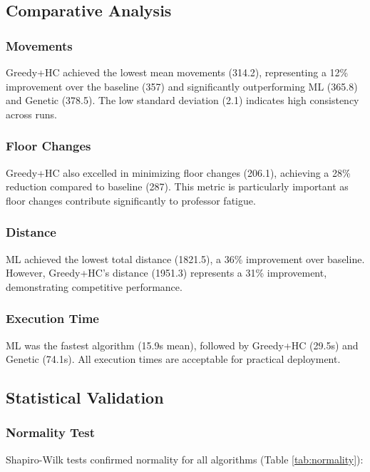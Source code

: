 \documentclass[algorithms,article,submit,pdftex,moreauthors]{Definitions/mdpi}
\begin{document}
\subsection{Comparative Analysis}

\subsubsection{Movements}

Greedy+HC achieved the lowest mean movements (314.2), representing a 12\% improvement over the baseline (357) and significantly outperforming ML (365.8) and Genetic (378.5). The low standard deviation (2.1) indicates high consistency across runs.

\subsubsection{Floor Changes}

Greedy+HC also excelled in minimizing floor changes (206.1), achieving a 28\% reduction compared to baseline (287). This metric is particularly important as floor changes contribute significantly to professor fatigue.

\subsubsection{Distance}

ML achieved the lowest total distance (1821.5), a 36\% improvement over baseline. However, Greedy+HC's distance (1951.3) represents a 31\% improvement, demonstrating competitive performance.

\subsubsection{Execution Time}

ML was the fastest algorithm (15.9s mean), followed by Greedy+HC (29.5s) and Genetic (74.1s). All execution times are acceptable for practical deployment.

\subsection{Statistical Validation}

\subsubsection{Normality Test}

Shapiro-Wilk tests confirmed normality for all algorithms (Table \ref{tab:normality}):
\end{document}
